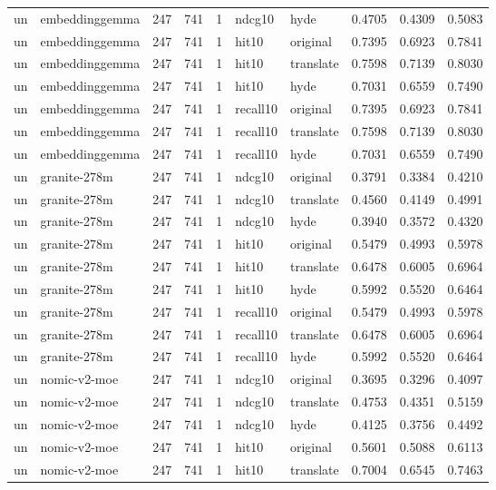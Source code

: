 \begin{tabular}{llrrrllrrr}
un & embeddinggemma & 247 & 741 & 1 & ndcg10 & hyde & 0.4705 & 0.4309 & 0.5083 \\
un & embeddinggemma & 247 & 741 & 1 & hit10 & original & 0.7395 & 0.6923 & 0.7841 \\
un & embeddinggemma & 247 & 741 & 1 & hit10 & translate & 0.7598 & 0.7139 & 0.8030 \\
un & embeddinggemma & 247 & 741 & 1 & hit10 & hyde & 0.7031 & 0.6559 & 0.7490 \\
un & embeddinggemma & 247 & 741 & 1 & recall10 & original & 0.7395 & 0.6923 & 0.7841 \\
un & embeddinggemma & 247 & 741 & 1 & recall10 & translate & 0.7598 & 0.7139 & 0.8030 \\
un & embeddinggemma & 247 & 741 & 1 & recall10 & hyde & 0.7031 & 0.6559 & 0.7490 \\
un & granite-278m & 247 & 741 & 1 & ndcg10 & original & 0.3791 & 0.3384 & 0.4210 \\
un & granite-278m & 247 & 741 & 1 & ndcg10 & translate & 0.4560 & 0.4149 & 0.4991 \\
un & granite-278m & 247 & 741 & 1 & ndcg10 & hyde & 0.3940 & 0.3572 & 0.4320 \\
un & granite-278m & 247 & 741 & 1 & hit10 & original & 0.5479 & 0.4993 & 0.5978 \\
un & granite-278m & 247 & 741 & 1 & hit10 & translate & 0.6478 & 0.6005 & 0.6964 \\
un & granite-278m & 247 & 741 & 1 & hit10 & hyde & 0.5992 & 0.5520 & 0.6464 \\
un & granite-278m & 247 & 741 & 1 & recall10 & original & 0.5479 & 0.4993 & 0.5978 \\
un & granite-278m & 247 & 741 & 1 & recall10 & translate & 0.6478 & 0.6005 & 0.6964 \\
un & granite-278m & 247 & 741 & 1 & recall10 & hyde & 0.5992 & 0.5520 & 0.6464 \\
un & nomic-v2-moe & 247 & 741 & 1 & ndcg10 & original & 0.3695 & 0.3296 & 0.4097 \\
un & nomic-v2-moe & 247 & 741 & 1 & ndcg10 & translate & 0.4753 & 0.4351 & 0.5159 \\
un & nomic-v2-moe & 247 & 741 & 1 & ndcg10 & hyde & 0.4125 & 0.3756 & 0.4492 \\
un & nomic-v2-moe & 247 & 741 & 1 & hit10 & original & 0.5601 & 0.5088 & 0.6113 \\
un & nomic-v2-moe & 247 & 741 & 1 & hit10 & translate & 0.7004 & 0.6545 & 0.7463 \\

\end{tabular}
